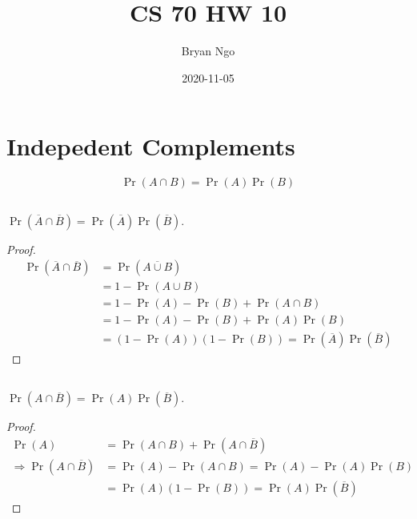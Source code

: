 \documentclass{article}
\title{CS 70 HW 10}
\author{Bryan Ngo}
\date{2020-11-05}
\begin{document}
\maketitle

\section{Indepedent Complements}

\begin{equation}
    \Pr(A \cap B) = \Pr(A) \Pr(B)
\end{equation}

\subsection{}

\begin{theorem}
    \(\Pr(\overline{A} \cap \overline{B}) = \Pr(\overline{A}) \Pr(\overline{B})\).
\end{theorem}
\begin{proof}
    \begin{align}
        \Pr(\overline{A} \cap \overline{B}) &= \Pr(\overline{A \cup B}) \\
        &= 1 - \Pr(A \cup B) \\
        &= 1 - \Pr(A) - \Pr(B) + \Pr(A \cap B) \\
        &= 1 - \Pr(A) - \Pr(B) + \Pr(A) \Pr(B) \\
        &= (1 - \Pr(A)) (1 - \Pr(B)) = \Pr(\overline{A}) \Pr(\overline{B})
    \end{align}
\end{proof}

\subsection{}

\begin{theorem}
    \(\Pr(A \cap \overline{B}) = \Pr(A) \Pr(\overline{B})\).
\end{theorem}
\begin{proof}
    \begin{align}
        \Pr(A) &= \Pr(A \cap B) + \Pr(A \cap \overline{B}) \\
        \Rightarrow \Pr(A \cap \overline{B}) &= \Pr(A) - \Pr(A \cap B) = \Pr(A) - \Pr(A) \Pr(B) \\
        &= \Pr(A) (1 - \Pr(B)) = \Pr(A) \Pr(\overline{B})
    \end{align}
\end{proof}
\end{document}
